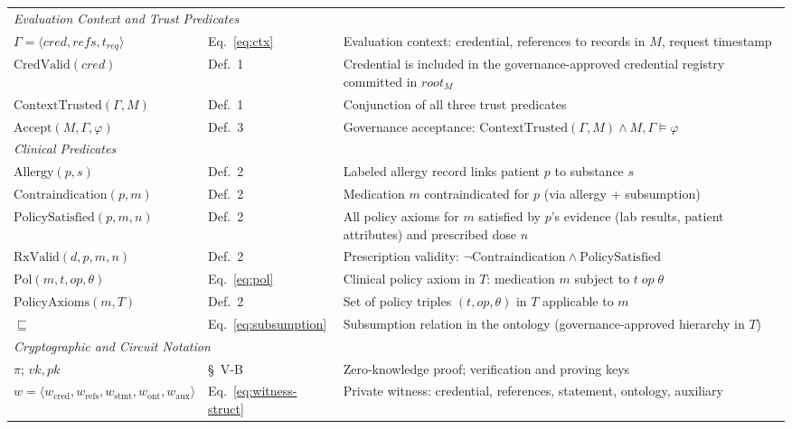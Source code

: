 \documentclass[journal]{IEEEtran}
\begin{document}
\begin{table}[!ht]
\begin{tabular}{p{4.5cm} p{1.4cm} p{10.5cm}}
\multicolumn{3}{l}{\textit{Evaluation Context and Trust Predicates}} \\
$\Gamma = \langle \mathit{cred}, \mathit{refs}, t_{\mathit{req}} \rangle$ & Eq.~\ref{eq:ctx} & Evaluation context: credential, references to records in $M$, request timestamp \\
$\mathrm{CredValid}(\mathit{cred})$ & Def.~1 & Credential is included in the governance-approved credential registry committed in $\mathit{root}_M$ \\
$\mathrm{ContextTrusted}(\Gamma, M)$ & Def.~1 & Conjunction of all three trust predicates \\
$\mathrm{Accept}(M, \Gamma, \varphi)$ & Def.~3 & Governance acceptance: $\mathrm{ContextTrusted}(\Gamma, M) \wedge M, \Gamma \models \varphi$ \\
\midrule

\multicolumn{3}{l}{\textit{Clinical Predicates}} \\
$\mathrm{Allergy}(p, s)$ & Def.~2 & Labeled allergy record links patient $p$ to substance $s$ \\
$\mathrm{Contraindication}(p, m)$ & Def.~2 & Medication $m$ contraindicated for $p$ (via allergy + subsumption) \\
$\mathrm{PolicySatisfied}(p, m, n)$ & Def.~2 & All policy axioms for $m$ satisfied by $p$'s evidence (lab results, patient attributes) and prescribed dose $n$ \\
$\mathrm{RxValid}(d, p, m, n)$ & Def.~2 & Prescription validity: $\neg \mathrm{Contraindication} \wedge \mathrm{PolicySatisfied}$ \\
$\mathrm{Pol}(m, t, \mathit{op}, \theta)$ & Eq.~\ref{eq:pol} & Clinical policy axiom in $T$: medication $m$ subject to $t\;\mathit{op}\;\theta$ \\
$\mathrm{PolicyAxioms}(m, T)$ & Def.~2 & Set of policy triples $(t, \mathit{op}, \theta)$ in $T$ applicable to $m$ \\
$\sqsubseteq$ & Eq.~\ref{eq:subsumption} & Subsumption relation in the ontology (governance-approved hierarchy in $T$) \\
\midrule

\multicolumn{3}{l}{\textit{Cryptographic and Circuit Notation}} \\
$\pi$;\; $\mathit{vk}, \mathit{pk}$ & \S~V-B & Zero-knowledge proof; verification and proving keys \\
$w = \langle w_{\mathrm{cred}}, w_{\mathrm{refs}}, w_{\mathrm{stmt}}, w_{\mathrm{ont}}, w_{\mathrm{aux}} \rangle$ & Eq.~\ref{eq:witness-struct} & Private witness: credential, references, statement, ontology, auxiliary \\


\end{tabular}
\end{table}
\end{document}
